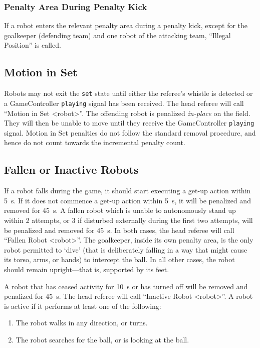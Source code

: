 \subsubsection{Penalty Area During Penalty Kick}
\label{sec:ip_penalty_kick}

If a robot enters the relevant penalty area during a penalty kick, except for the goalkeeper (defending team) and one robot of the attacking team, ``Illegal Position'' is called.

\subsection{Motion in Set}
\label{sec:motion_in_set}

Robots may not exit the \texttt{set} state until either the referee's whistle is detected or a GameController \texttt{playing} signal has been received.
The head referee will call ``Motion in Set \textless robot\textgreater''.
The offending robot is penalized \textit{in-place} on the field.  They will then be unable to move until they receive the GameController \texttt{playing} signal.  Motion in Set penalties do not follow the standard removal procedure, and hence do not count towards the incremental penalty count.

\subsection{Fallen or Inactive Robots}
\label{sec:fallenrobots}

If a robot falls during the game, it should start executing a get-up action within \qty{5}{\second}.
If it does not commence a get-up action within \qty{5}{\second}, it will be penalized and removed for \qty{45}{\second}.
A fallen robot which is unable to autonomously stand up within 2 attempts, or 3 if disturbed externally during the first two attempts, will be penalized and removed for \qty{45}{\second}.
In both cases, the head referee will call ``Fallen Robot  \textless robot\textgreater''.
The goalkeeper, inside its own penalty area, is the only robot permitted to `dive' (that is deliberately falling in a way that might cause its torso, arms, or hands) to intercept the ball. In all other cases, the robot should remain upright---that is, supported by its feet.

A robot that has ceased activity for \qty{10}{\second} or has turned off will be removed and penalized for \qty{45}{\second}.
The head referee will call ``Inactive Robot  \textless robot\textgreater''.
A robot is active if it performs at least one of the following:
\begin{enumerate}
  \item The robot walks in any direction, or turns.
  \item The robot searches for the ball, or is looking at the ball.
\end{enumerate}

